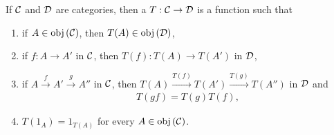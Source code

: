     \begin{definition}\label{def:covariant-functor}
        If $\mathcal{C}$ and $\mathcal{D}$ are categories, then a  $T:\mathcal{C} \rightarrow \mathcal{D}$ is a function such that
            \begin{enumerate}[label = (\arabic*)]
                \item if $A \in \operatorname{obj}{(\mathcal{C})}$, then $T(A) \in \operatorname{obj}{(\mathcal{D})}$,
                \item if $f:A \rightarrow A'$ in $\mathcal{C}$, then $T(f):T(A) \rightarrow T(A')$ in $\mathcal{D}$,
                \item if $A \xrightarrow{f} A' \xrightarrow{g} A''$ in $\mathcal{C}$, then $T(A) \xrightarrow{T(f)} T(A') \xrightarrow{T(g)} T(A'')$ in $\mathcal{D}$ and
                    \begin{equation*}
                    \begin{split}
                        T(gf) = T(g)T(f),
                    \end{split}
                    \end{equation*}
                \item $T(1_A) = 1_{T(A)}$ for every $A \in \operatorname{obj}{(\mathcal{C})}$.
            \end{enumerate}
    \end{definition}

